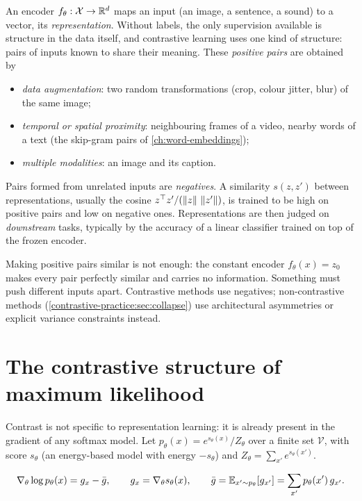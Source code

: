 \begin{notechapter}
An encoder $f_\theta:\mathcal X\to\mathbb{R}^d$ maps an input (an image, a sentence, a sound) to a vector, its \emph{representation}.
Without labels, the only supervision available is structure in the data itself, and
contrastive learning uses one kind of structure: pairs of inputs known to share their
meaning. These \emph{positive pairs} are obtained by
\begin{itemize}[nosep]
  \item \emph{data augmentation}: two random transformations (crop, colour jitter, blur) of the same
        image;
  \item \emph{temporal or spatial proximity}: neighbouring frames of a video, nearby words of a
        text (the skip-gram pairs of \cref{ch:word-embeddings});
  \item \emph{multiple modalities}: an image and its caption.
\end{itemize}
Pairs formed from unrelated inputs are \emph{negatives}. A similarity $s(z, z')$ between representations,
usually the cosine $z^\top z'/(\left\|z\right\|\,\left\|z'\right\|)$, is trained to be high on positive pairs and low on negative ones.
Representations are then judged on \emph{downstream} tasks, typically by the accuracy of a
linear classifier trained on top of the frozen encoder.

\begin{pitfall}
Making positive pairs similar is not enough: the constant encoder $f_\theta(x) = z_0$ makes every pair
perfectly similar and carries no information. Something must push different inputs apart.
Contrastive methods use negatives; non-contrastive methods (\cref{contrastive-practice:sec:collapse})
use architectural asymmetries or explicit variance constraints instead.
\end{pitfall}

\section{The contrastive structure of maximum likelihood}\label{contrastive-learning:sec:mle}

Contrast is not specific to representation learning: it is already present in the gradient of
any softmax model. Let $p_\theta(x) = e^{s_\theta(x)}/Z_\theta$ over a finite set $\mathcal V$, with score $s_\theta$ (an energy-based model with energy $-s_\theta$) and
$Z_\theta = \sum_{x'}e^{s_\theta(x')}$.

\begin{proposition}\label{contrastive-learning:prop:mle}
\[
  \nabla_\theta\log p_\theta(x) = g_x - \bar g,\qquad g_x = \nabla_\theta s_\theta(x),\qquad\bar g = \mathbb{E}_{x'\sim p_\theta}[g_{x'}] = \sum_{x'}p_\theta(x')\,g_{x'} .
\]
\end{proposition}


\end{notechapter}
